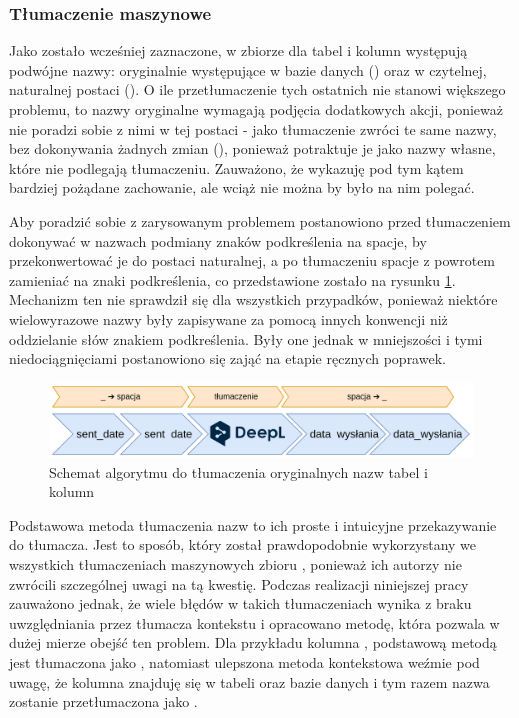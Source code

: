 \subsubsection{Tłumaczenie maszynowe}
Jako zostało wcześniej zaznaczone, w zbiorze  dla tabel i kolumn występują podwójne nazwy: oryginalnie występujące w bazie danych () oraz w czytelnej, naturalnej postaci (). O ile przetłumaczenie tych ostatnich nie stanowi większego problemu, to nazwy oryginalne wymagają podjęcia dodatkowych akcji, ponieważ  nie poradzi sobie z nimi w tej postaci - jako tłumaczenie zwróci te same nazwy, bez dokonywania żadnych zmian (), ponieważ potraktuje je jako nazwy własne, które nie podlegają tłumaczeniu. Zauważono, że  wykazuję pod tym kątem bardziej pożądane zachowanie, ale wciąż nie można by było na nim polegać. 

Aby poradzić sobie z zarysowanym problemem postanowiono przed tłumaczeniem dokonywać w nazwach podmiany znaków podkreślenia na spacje, by przekonwertować je do postaci naturalnej, a po tłumaczeniu spacje z powrotem zamieniać na znaki podkreślenia, co przedstawione zostało na rysunku \ref{fig:multi-word-translation}. Mechanizm ten nie sprawdził się dla wszystkich przypadków, ponieważ niektóre wielowyrazowe nazwy były zapisywane za pomocą innych konwencji niż oddzielanie słów znakiem podkreślenia. Były one jednak w mniejszości i tymi niedociągnięciami postanowiono się zająć na etapie ręcznych poprawek.

\begin{figure}[ht!]
  \centering
  \includegraphics[width=1.0\linewidth]{images/multi_word_translation.png}
  \caption{Schemat algorytmu do tłumaczenia oryginalnych nazw tabel i kolumn}
  \label{fig:multi-word-translation}
\end{figure}

Podstawowa metoda tłumaczenia nazw to ich proste i intuicyjne przekazywanie do tłumacza. Jest to sposób, który został prawdopodobnie wykorzystany we wszystkich tłumaczeniach maszynowych zbioru , ponieważ ich autorzy nie zwrócili szczególnej uwagi na tą kwestię. Podczas realizacji niniejszej pracy zauważono jednak, że wiele błędów w takich tłumaczeniach wynika z braku uwzględniania przez tłumacza kontekstu i opracowano metodę, która pozwala w dużej mierze obejść ten problem. Dla przykładu kolumna , podstawową metodą jest tłumaczona jako , natomiast ulepszona metoda kontekstowa weźmie pod uwagę, że kolumna znajduję się w tabeli  oraz bazie danych  i tym razem nazwa zostanie przetłumaczona jako .

